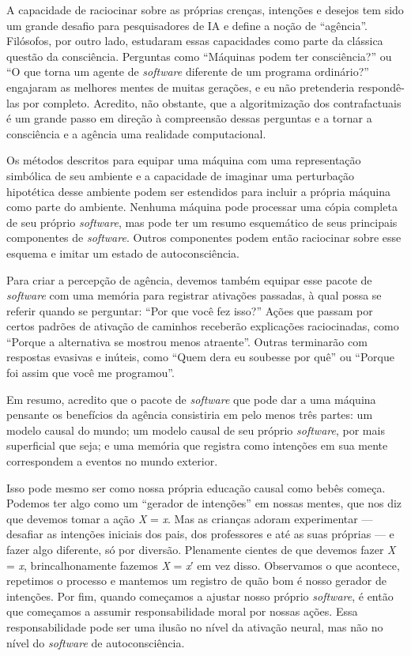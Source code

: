 \documentclass[11pt,a5paper,twoside]{book}
\begin{document}
A capacidade de raciocinar sobre as próprias crenças, intenções e desejos tem sido um grande desafio para pesquisadores de IA e define a noção de “agência”. Filósofos, por outro lado, estudaram essas capacidades como parte da clássica questão da consciência. Perguntas como “Máquinas podem ter consciência?” ou “O que torna um agente de \textit{software} diferente de um programa ordinário?” engajaram as melhores mentes de muitas gerações, e eu não pretenderia respondê-las por completo. Acredito, não obstante, que a algoritmização dos contrafactuais é um grande passo em direção à compreensão dessas perguntas e a tornar a consciência e a agência uma realidade computacional.

Os métodos descritos para equipar uma máquina com uma representação simbólica de seu ambiente e a capacidade de imaginar uma perturbação hipotética desse ambiente podem ser estendidos para incluir a própria máquina como parte do ambiente. Nenhuma máquina pode processar uma cópia completa de seu próprio \textit{software}, mas pode ter um resumo esquemático de seus principais componentes de \textit{software}. Outros componentes podem então raciocinar sobre esse esquema e imitar um estado de autoconsciência.

Para criar a percepção de agência, devemos também equipar esse pacote de \textit{software} com uma memória para registrar ativações passadas, à qual possa se referir quando se perguntar: “Por que você fez isso?” Ações que passam por certos padrões de ativação de caminhos receberão explicações raciocinadas, como “Porque a alternativa se mostrou menos atraente”. Outras terminarão com respostas evasivas e inúteis, como “Quem dera eu soubesse por quê” ou “Porque foi assim que você me programou”.

Em resumo, acredito que o pacote de \textit{software} que pode dar a uma máquina pensante os benefícios da agência consistiria em pelo menos três partes: um modelo causal do mundo; um modelo causal de seu próprio \textit{software}, por mais superficial que seja; e uma memória que registra como intenções em sua mente correspondem a eventos no mundo exterior.

Isso pode mesmo ser como nossa própria educação causal como bebês começa. Podemos ter algo como um “gerador de intenções” em nossas mentes, que nos diz que devemos tomar a ação \textit{X} = \textit{x}. Mas as crianças adoram experimentar — desafiar as intenções iniciais dos pais, dos professores e até as suas próprias — e fazer algo diferente, só por diversão. Plenamente cientes de que devemos fazer \textit{X} = \textit{x}, brincalhonamente fazemos \textit{X} = \textit{x}′ em vez disso. Observamos o que acontece, repetimos o processo e mantemos um registro de quão bom é nosso gerador de intenções. Por fim, quando começamos a ajustar nosso próprio \textit{software}, é então que começamos a assumir responsabilidade moral por nossas ações. Essa responsabilidade pode ser uma ilusão no nível da ativação neural, mas não no nível do \textit{software} de autoconsciência.
\end{document}
